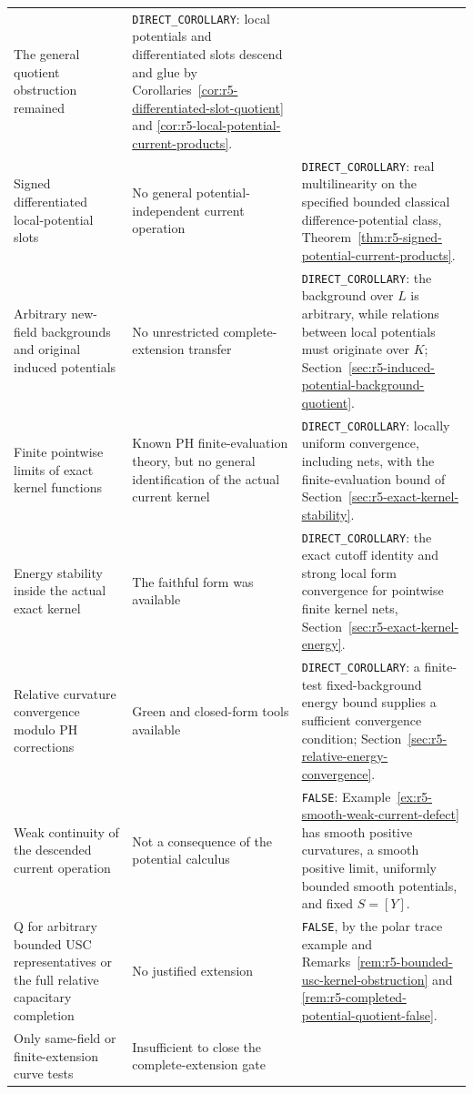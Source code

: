 \documentclass[11pt,a4paper]{article}
\numberwithin{equation}{section}
\theoremstyle{definition}
\theoremstyle{remark}
\begin{document}
\begin{longtable}{@{}p{}p{}p{}@{}}
The general quotient obstruction remained &
\texttt{DIRECT\_COROLLARY}: local potentials and differentiated
slots descend and glue by
Corollaries~\ref{cor:r5-differentiated-slot-quotient} and
\ref{cor:r5-local-potential-current-products}.\\[4pt]
Signed differentiated local-potential slots &
No general potential-independent current operation &
\texttt{DIRECT\_COROLLARY}: real multilinearity on the
specified bounded classical difference-potential class,
Theorem~\ref{thm:r5-signed-potential-current-products}.\\[4pt]
Arbitrary new-field backgrounds and original induced potentials &
No unrestricted complete-extension transfer &
\texttt{DIRECT\_COROLLARY}: the background over $L$ is
arbitrary, while relations between local potentials must
originate over $K$; Section~\ref{sec:r5-induced-potential-background-quotient}.\\[4pt]
Finite pointwise limits of exact kernel functions &
Known PH finite-evaluation theory, but no general identification
of the actual current kernel &
\texttt{DIRECT\_COROLLARY}: locally uniform convergence,
including nets, with the finite-evaluation bound of
Section~\ref{sec:r5-exact-kernel-stability}.\\[4pt]
Energy stability inside the actual exact kernel &
The faithful form was available &
\texttt{DIRECT\_COROLLARY}: the exact cutoff identity and
strong local form convergence for pointwise finite kernel nets,
Section~\ref{sec:r5-exact-kernel-energy}.\\[4pt]
Relative curvature convergence modulo PH corrections &
Green and closed-form tools available &
\texttt{DIRECT\_COROLLARY}: a finite-test fixed-background
energy bound supplies a sufficient convergence condition;
Section~\ref{sec:r5-relative-energy-convergence}.\\[4pt]
Weak continuity of the descended current operation &
Not a consequence of the potential calculus &
\texttt{FALSE}: Example~\ref{ex:r5-smooth-weak-current-defect}
has smooth positive curvatures, a smooth positive limit,
uniformly bounded smooth potentials, and fixed $S=[Y]$.\\[4pt]
Q for arbitrary bounded USC representatives or the full
relative capacitary completion &
No justified extension &
\texttt{FALSE}, by the polar trace example and
Remarks~\ref{rem:r5-bounded-usc-kernel-obstruction} and
\ref{rem:r5-completed-potential-quotient-false}.\\
Only same-field or finite-extension curve tests &
Insufficient to close the complete-extension gate &

\end{longtable}
\end{document}
